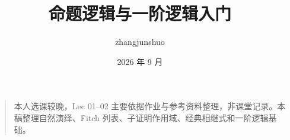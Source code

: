 \documentclass[UTF8,a4paper,11pt]{ctexart}
\title{命题逻辑与一阶逻辑入门}
\author{zhangjunshuo}\date{2026 年 9 月}
\begin{document}
\maketitle
\begin{quote}
本人选课较晚，Lec 01–02 主要依据作业与参考资料整理，非课堂记录。本稿整理自然演绎、Fitch 列表、子证明作用域、经典相继式和一阶逻辑基础。
\end{quote}
\tableofcontents\clearpage
\clearpage
\clearpage

\end{document}

